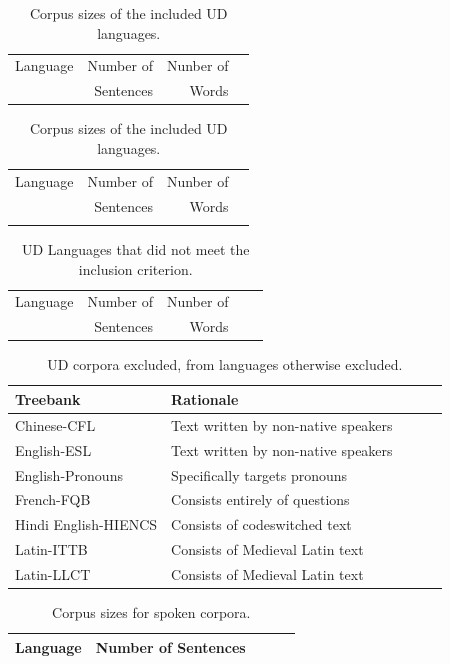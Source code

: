 \documentclass[11pt,a4paper]{article}
\begin{document}
\begin{table}
\begin{tabular}{lrrr}
Language & Number of  & Nunber of \\ 
	& Sentences & Words \\\hline

\end{tabular}
\begin{tabular}{lrrr}
Language & Number of  & Nunber of \\ 
	& Sentences & Words \\\hline

       &            & \\
\end{tabular}
	\caption{Corpus sizes of the included UD languages.}\label{tab:sizes}
\end{table}


\begin{table}
\begin{longtable}{lrrrr}
Language & Number of  & Nunber of \\ 
	& Sentences & Words \\\hline

\end{longtable}
	\caption{UD Languages that did not meet the inclusion criterion.}\label{tab:excluded}
\end{table}


\begin{table}
\begin{longtable}{lllll}
Treebank & Rationale \\ \hline
Chinese-CFL & Text written by non-native speakers\\
English-ESL & Text written by non-native speakers \\
English-Pronouns & Specifically targets pronouns \\
French-FQB & Consists entirely of questions \\
Hindi English-HIENCS &  Consists of codeswitched text \\
Latin-ITTB & Consists of Medieval Latin text \\
Latin-LLCT & Consists of Medieval Latin text  \\ 
\end{longtable}
	\caption{UD corpora excluded, from languages otherwise excluded.}\label{tab:excluded-corpora}
\end{table}



\begin{table}
\begin{longtable}{lrrrr}
Language & Number of Sentences  \\ \hline



\end{longtable}
	\caption{Corpus sizes for spoken corpora.}\label{tab:spoken-sizes}
\end{table}
\end{document}
